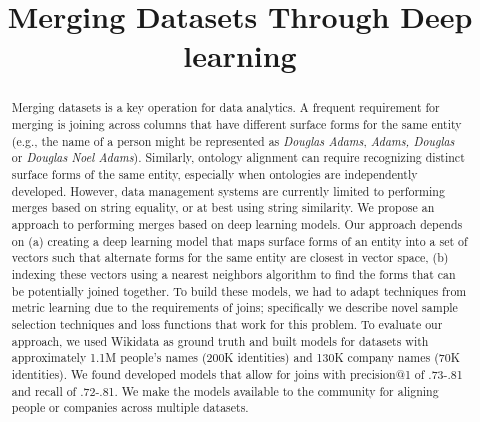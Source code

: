\documentclass[letterpaper]{article} %
\begin{document}
%
\title{Merging Datasets Through Deep learning}




\maketitle
\begin{abstract}
Merging datasets is a key operation for data analytics.  A frequent
requirement for merging is joining across columns that have
different surface forms for the same entity (e.g., the name of a
person might be represented as \textit{Douglas Adams},
\textit{Adams, Douglas} or \textit{Douglas Noel Adams}).  Similarly,
ontology alignment can require recognizing distinct surface forms of
the same entity, especially when ontologies are independently
developed.  However, data management systems are currently limited
to performing merges based on string equality, or at best using
string similarity.  We propose an approach to performing merges
based on deep learning models.  Our approach depends on (a) creating
a deep learning model that maps surface forms of an entity into a
set of vectors such that alternate forms for the same entity are
closest in vector space, (b) indexing these vectors using a nearest
neighbors algorithm to find the forms that can be potentially joined
together.  To build these models, we had to adapt techniques from
metric learning due to the requirements of joins; specifically we describe 
novel sample selection techniques and loss functions that work for this problem.  
To evaluate our approach, we used Wikidata as ground truth
and built models for datasets with approximately 1.1M people's names
(200K identities) and 130K company names (70K identities).  We found developed models that 
allow for joins with precision@1 of .73-.81 and
recall of .72-.81.  We make the models available to the community
for aligning people or companies across multiple datasets.  
\end{abstract}








  
  
  
\end{document}
